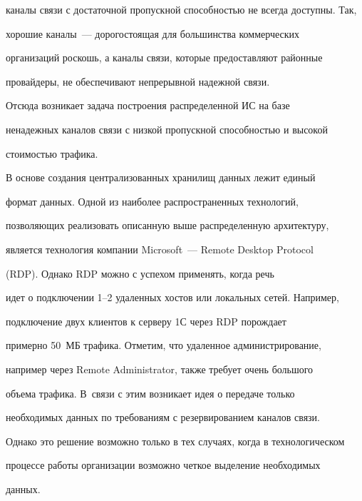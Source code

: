 каналы связи с достаточной пропускной способностью не всегда доступны. Так, 


хорошие каналы~--- дорогостоящая для большинства коммерческих 


организаций роскошь, а каналы связи, которые предоставляют районные 


провайдеры, не обеспечивают непрерывной надежной связи. 


  


  Отсюда возникает задача построения распределенной ИС на базе 


ненадежных каналов связи с низкой пропускной способностью и высокой 


стоимостью тра\-фика. 


{





}


  


  В основе создания централизованных хранилищ данных лежит единый 


формат данных. Одной из наиболее распространенных технологий, 


позволяющих реализовать описанную выше распределенную архитектуру, 


является технология компании Microsoft~--- Remote Desktop Protocol 


(RDP). Однако {RDP} можно с успехом применять, когда речь 


идет о подключении 1--2 удаленных хостов или локальных сетей. Например, 


подключение двух клиентов к серверу {1С} через RDP по\-рож\-да\-ет 


примерно 50~МБ трафика. Отметим, что удаленное администрирование, 


например через Remote Administrator, также требует очень большого 


объема трафика. В~связи с этим возникает идея о передаче только 


необходимых данных по требованиям с резервированием каналов связи. 


Однако это решение возможно только в тех случаях, когда в технологическом 


процессе работы организации возможно четкое выделение необходимых 


данных. 


  


